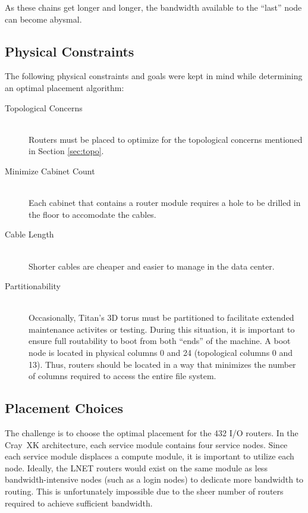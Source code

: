 As these chains get longer and longer, the bandwidth available to the ``last''
node can become abysmal.

\subsection{Physical Constraints}


The following physical constraints and goals were kept in mind while
determining an optimal placement algorithm:

\begin{description}
  \item[Topological Concerns] \hfill \\
    Routers must be placed to optimize for the topological concerns mentioned
    in Section \ref{sec:topo}.
  \item[Minimize Cabinet Count] \hfill \\
    Each cabinet that contains a router module requires a hole to be drilled in
    the floor to accomodate the cables.
  \item[Cable Length] \hfill \\
    Shorter cables are cheaper and easier to manage in the data center.
  \item[Partitionability] \hfill \\
    Occasionally, Titan's 3D torus must be partitioned to facilitate extended
    maintenance activites or testing.  During this situation, it is important to
    ensure full routability to boot from both ``ends'' of the machine.  A boot
    node is located in physical columns 0 and 24 (topological columns 0 and 13).
    Thus, routers should be located in a way that minimizes the number of
    columns required to access the entire file system.
\end{description}

\subsection{Placement Choices}

The challenge is to choose the optimal placement for the 432 I/O routers. In
the Cray~XK architecture, each service module contains four service nodes.
Since each service module displaces a compute module, it is important to
utilize each node.  Ideally, the LNET routers would exist on the same module as
less bandwidth-intensive nodes (such as a login nodes) to dedicate more
bandwidth to routing.  This is unfortunately impossible due to the sheer number
of routers required to achieve sufficient bandwidth.

